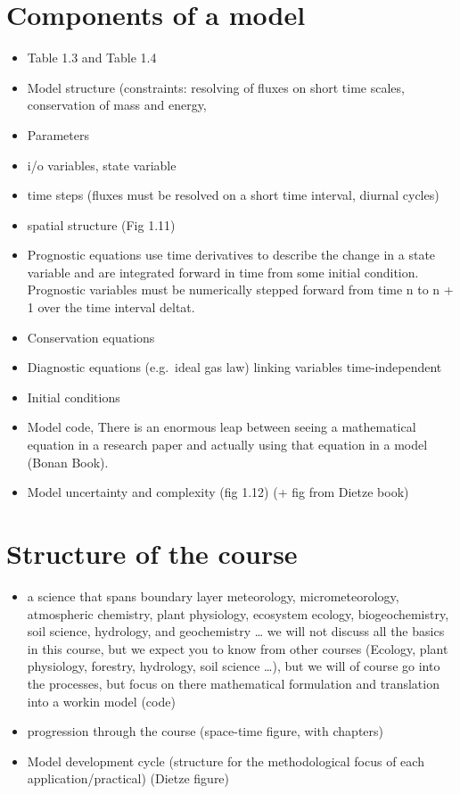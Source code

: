 \documentclass[oneside]{book}
\providecommand{\tightlist}{%
  \setlength{\itemsep}{0pt}\setlength{\parskip}{0pt}}
\begin{document}
\section{Components of a model}\label{components-of-a-model}

\begin{itemize}
\tightlist
\item
  Table 1.3 and Table 1.4
\item
  Model structure (constraints: resolving of fluxes on short time
  scales, conservation of mass and energy,
\item
  Parameters
\item
  i/o variables, state variable
\item
  time steps (fluxes must be resolved on a short time interval, diurnal
  cycles)
\item
  spatial structure (Fig 1.11)
\item
  Prognostic equations use time derivatives to describe the change in a
  state variable and are integrated forward in time from some initial
  condition. Prognostic variables must be numerically stepped forward
  from time n to n + 1 over the time interval deltat.
\item
  Conservation equations
\item
  Diagnostic equations (e.g.~ideal gas law) linking variables
  time-independent
\item
  Initial conditions
\item
  Model code, There is an enormous leap between seeing a mathematical
  equation in a research paper and actually using that equation in a
  model (Bonan Book).
\item
  Model uncertainty and complexity (fig 1.12) (+ fig from Dietze book)
\end{itemize}

\section{Structure of the course}\label{structure-of-the-course}

\begin{itemize}
\tightlist
\item
  a science that spans boundary layer meteorology, micrometeorology,
  atmospheric chemistry, plant physiology, ecosystem ecology,
  biogeochemistry, soil science, hydrology, and geochemistry \ldots{} we
  will not discuss all the basics in this course, but we expect you to
  know from other courses (Ecology, plant physiology, forestry,
  hydrology, soil science \ldots{}), but we will of course go into the
  processes, but focus on there mathematical formulation and translation
  into a workin model (code)
\item
  progression through the course (space-time figure, with chapters)
\item
  Model development cycle (structure for the methodological focus of
  each application/practical) (Dietze figure)
\end{itemize}
\end{document}
